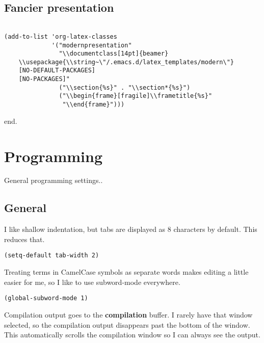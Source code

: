 \documentclass[12pt]{article}
\begin{document}
\subsection{Fancier presentation}
\label{sec:org13dced1}

\begin{verbatim}

(add-to-list 'org-latex-classes
             '("modernpresentation"
               "\\documentclass[14pt]{beamer}
    \\usepackage{\\string~\"/.emacs.d/latex_templates/modern\"}
    [NO-DEFAULT-PACKAGES]
    [NO-PACKAGES]"
               ("\\section{%s}" . "\\section*{%s}")
               ("\\begin{frame}[fragile]\\frametitle{%s}"
                "\\end{frame}")))

\end{verbatim}
end. 

\section{Programming}
\label{sec:orgb80ae5b}

General programming settings..

\subsection{General}
\label{sec:org34238b5}

I like shallow indentation, but tabs are displayed as 8 characters by default. This reduces that.

\begin{verbatim}
(setq-default tab-width 2)
\end{verbatim}

Treating terms in CamelCase symbols as separate words makes editing a little
easier for me, so I like to use subword-mode everywhere.
\begin{verbatim}
(global-subword-mode 1)
\end{verbatim}

Compilation output goes to the \textbf{compilation} buffer. I rarely have that window
selected, so the compilation output disappears past the bottom of the window.
This automatically scrolls the compilation window so I can always see the
output.
\end{document}
